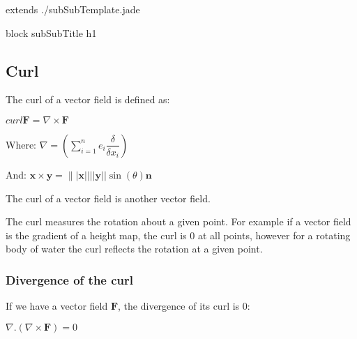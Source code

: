 extends ./subSubTemplate.jade

block subSubTitle
	h1
\subsection{Curl}

The curl of a vector field is defined as:

\(curl \mathbf F=\nabla \times \mathbf F\)

Where: \(\nabla =(\sum_{i=1}^n e_i\dfrac{\delta }{\delta x_i})\)

And: \(\mathbf x\times \mathbf y=\||\mathbf x|| ||\mathbf y|| \sin(\theta )\mathbf n\)

The curl of a vector field is another vector field.

The curl measures the rotation about a given point. For example if a vector field is the gradient of a height map, the curl is \(0\) at all points, however for a rotating body of water the curl reflects the rotation at a given point.

\subsubsection{Divergence of the curl}

If we have a vector field \(\mathbf F\), the divergence of its curl is \(0\):

\(\nabla . (\nabla \times \mathbf F)=0\)

